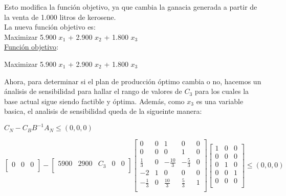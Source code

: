 \documentclass[10pt,a4paper]{article}
\begin{document}
\begin{enumerate}[label=\textbf{\sffamily\large\arabic*.}]
\begin{itemize}
\begin{itemize}
        \end{itemize}

    \end{itemize}

    Esto modifica la función objetivo, ya que cambia la ganacia generada a partir de la venta de 1.000 litros de kerosene. \\ 
    La nueva función objetivo es: \\
    Maximizar 5.900 $x_{1}$ + 2.900 $x_{2}$ + 1.800 $x_{3}$ \\
    

    \underline{Función objetivo}: 

    \begin{center}
      
        Maximizar 5.900 $x_{1}$ + 2.900 $x_{2}$ + 1.800 $x_{3}$

    \end{center}

    Ahora, para determinar si el plan de producción óptimo cambia o no, hacemos un ánalisis de sensibilidad para hallar el rango
    de valores de $C_{3}$ para los cuales la base actual sigue siendo factible y óptima. Además, como $x_{3}$ es una variable basica,
    el analisis de sensibilidad queda de la sigueinte manera: \\

    \clearpage
    \begin{center}
        $C_{N} - C_{B}B^{-1}A_N \leq (0, 0, 0)$
        \end{center}

        \[
            \begin{bmatrix}
                0           &    0	         &    0          \\
            \end{bmatrix}  - \begin{bmatrix}
                5900           &    2900	         &    C_3 & 0 & 0          \\
            \end{bmatrix} \begin{bmatrix}
            0           & 0 &    1	        &   0            &	0 \\
            0           & 0 &    0	        &   1            &	0 \\
          \frac{1}{3}   & 0 & -\frac{10}{3} & -\frac{5}{3}   &	0 \\
           -2           & 1 &    0	        &   0            &	0 \\
           -\frac{1}{3} & 0 & \frac{10}{3}	& \frac{5}{3}    &	1 \\
        \end{bmatrix}    
        \begin{bmatrix}
        1 & 0 & 0 \\
        0 & 0 & 0 \\
        0 & 1 & 0 \\
        0 & 0 & 1 \\
        0 & 0 & 0 \\
        \end{bmatrix}
        \leq (0, 0, 0) \] 


\end{enumerate}
\end{document}
